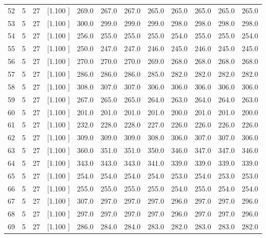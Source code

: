 \documentclass[12pt,a4paper]{article}
\begin{document}
\begin{center}
{\begin{tabular}{r r r r r r r r r r r r}
  52&  5& 27&[1.100     ]&   269.0&   267.0&   267.0&   265.0&   265.0&   265.0&   265.0&   265.0\\[-0.02in]
  53&  5& 27&[1.100     ]&   300.0&   299.0&   299.0&   299.0&   298.0&   298.0&   298.0&   298.0\\[-0.02in]
  54&  5& 27&[1.100     ]&   256.0&   255.0&   255.0&   255.0&   254.0&   255.0&   255.0&   254.0\\[-0.02in]
  55&  5& 27&[1.100     ]&   250.0&   247.0&   247.0&   246.0&   245.0&   246.0&   245.0&   245.0\\[-0.02in]
  56&  5& 27&[1.100     ]&   270.0&   270.0&   270.0&   269.0&   268.0&   268.0&   268.0&   268.0\\[-0.02in]
  57&  5& 27&[1.100     ]&   286.0&   286.0&   286.0&   285.0&   282.0&   282.0&   282.0&   282.0\\[-0.02in]
  58&  5& 27&[1.100     ]&   308.0&   307.0&   307.0&   306.0&   306.0&   306.0&   306.0&   306.0\\[-0.02in]
  59&  5& 27&[1.100     ]&   267.0&   265.0&   265.0&   264.0&   263.0&   264.0&   264.0&   263.0\\[-0.02in]
  60&  5& 27&[1.100     ]&   201.0&   201.0&   201.0&   201.0&   200.0&   201.0&   201.0&   200.0\\[-0.02in]
  61&  5& 27&[1.100     ]&   232.0&   228.0&   228.0&   227.0&   226.0&   226.0&   226.0&   226.0\\[-0.02in]
  62&  5& 27&[1.100     ]&   309.0&   309.0&   309.0&   308.0&   306.0&   307.0&   307.0&   306.0\\[-0.02in]
  63&  5& 27&[1.100     ]&   360.0&   351.0&   351.0&   350.0&   346.0&   347.0&   347.0&   346.0\\[-0.02in]
  64&  5& 27&[1.100     ]&   343.0&   343.0&   343.0&   341.0&   339.0&   339.0&   339.0&   339.0\\[-0.02in]
  65&  5& 27&[1.100     ]&   254.0&   254.0&   254.0&   254.0&   253.0&   254.0&   253.0&   253.0\\[-0.02in]
  66&  5& 27&[1.100     ]&   255.0&   255.0&   255.0&   255.0&   254.0&   255.0&   254.0&   254.0\\[-0.02in]
  67&  5& 27&[1.100     ]&   307.0&   297.0&   297.0&   297.0&   296.0&   297.0&   297.0&   296.0\\[-0.02in]
  68&  5& 27&[1.100     ]&   297.0&   297.0&   297.0&   297.0&   296.0&   297.0&   297.0&   296.0\\[-0.02in]
  69&  5& 27&[1.100     ]&   286.0&   284.0&   284.0&   283.0&   282.0&   283.0&   283.0&   282.0\\[-0.02in]

\end{tabular}}
\end{center}
\end{document}
